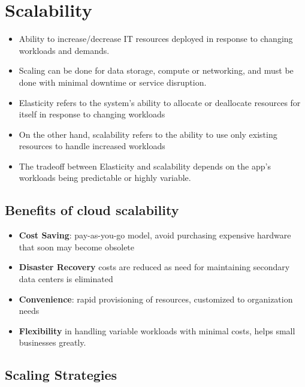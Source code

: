 \documentclass{article}
\begin{document}
\section{Scalability}
\begin{itemize}
    \item Ability to increase/decrease IT resources deployed in response to changing workloads and demands. 
    
    \item Scaling can be done for data storage, compute or networking, and must be done with minimal downtime or service disruption. 
    
    \item Elasticity refers to the system's ability to allocate or deallocate resources for itself in response to changing workloads
    
    \item On the other hand, scalability refers to the ability to use only existing resources to handle increased workloads
    
    \item The tradeoff between Elasticity and scalability depends on the app's workloads being predictable or highly variable.
\end{itemize}
\subsection{Benefits of cloud scalability}
\begin{itemize}
    \item \textbf{Cost Saving}: pay-as-you-go model, avoid purchasing expensive hardware that soon may become obsolete
    
    \item \textbf{Disaster Recovery} costs are reduced as need for maintaining secondary data centers is eliminated
    
    \item \textbf{Convenience}: rapid provisioning of resources, customized to organization needs
    
    \item \textbf{Flexibility} in handling variable workloads with minimal costs, helps small businesses greatly. 
\end{itemize}

\subsection{Scaling Strategies}
\end{document}
